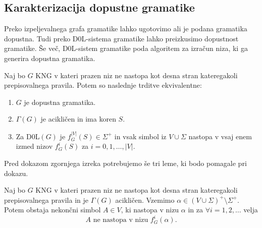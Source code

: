 \documentclass[fin1, tisk]{fmfdelo}
\providecommand{\abs}[1]{\left\lvert #1 \right\rvert}
\theoremstyle{definition}
\begin{document}
\subsection{Karakterizacija dopustne gramatike}

Preko izpeljevalnega grafa gramatike lahko ugotovimo ali je podana gramatika dopustna. Tudi preko
D$0$L-sistema gramatike lahko preizkusimo dopustnost gramatike. Še več, D$0$L-sistem gramatike
poda algoritem za izračun niza, ki ga generira dopustna gramatika.

\begin{izrek}\label{izrek:ekvivalence}
    Naj bo $G$ KNG v kateri prazen niz ne nastopa kot desna stran 
    kateregakoli prepisovalnega pravila. Potem so naslednje trditve ekvivalentne:
    \begin{enumerate}
        \item $G$ je dopustna gramatika.
        \item $\Gamma(G)$ je acikličen in ima koren $S$.
        \item Za D0L$(G)$ je $ f_G^{\abs{V}}(S) \in \Sigma^+ $ in vsak simbol iz
        $ V \cup \Sigma $ nastopa v vsaj enem izmed nizov $f_G^i(S)$ za $i=0, 1, \ldots, \abs{V}$.
    \end{enumerate}
\end{izrek}

Pred dokazom zgornjega izreka potrebujemo še tri leme, ki bodo pomagale pri dokazu.

\begin{lema}\label{lema:pomožna}
    Naj bo $G$ KNG v kateri prazen niz ne nastopa kot desna stran kateregakoli prepisovalnega 
    pravila in je $\Gamma(G)$ acikličen. Vzemimo $\alpha \in ( V \cup \Sigma)^+ \setminus \Sigma^+$.
    Potem obstaja nekončni simbol $ A \in V $, ki nastopa v nizu $\alpha$ in za $\forall i=1,2,\ldots$
    velja
    \[
        A \text{ ne nastopa v nizu } f^i_G(\alpha).
    \]
\end{lema}
\end{document}
